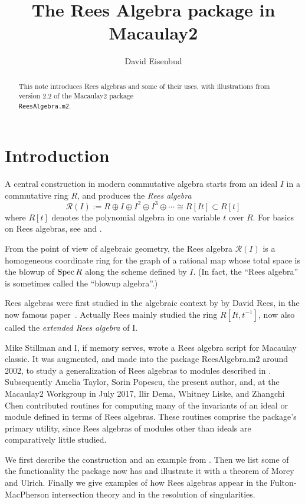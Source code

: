 \documentclass[twoside,12pt, leqno]{amsart}
\author{David Eisenbud}
\title{The Rees Algebra package in Macaulay2}
\def\RR{{\mathcal R}}
\def\Spec{{{\rm Spec}\,}}
\begin{document}
\begin{abstract}
This note introduces Rees algebras and some of their uses, with illustrations from version 2.2 of the Macaulay2 \cite{M2} package \\{\tt ReesAlgebra.m2}.
\end{abstract}

\maketitle

\section*{Introduction}
A central construction in modern commutative algebra starts from
an ideal $I$ in a commutative ring $R$, and produces the \emph{Rees algebra}
$$
\RR(I) :=  R\oplus I\oplus I^2\oplus I^3\oplus\cdots \cong R[It]\subset R[t]
$$ 
where $R[t]$ denotes the polynomial algebra in one variable $t$ over $R$. For basics on Rees algebras, see \cite{V} and \cite{SW}.

From the point of view of algebraic geometry, the Rees algebra $\RR(I)$ is a homogeneous
coordinate ring for the graph of a rational map whose total space is the blowup
of $\Spec R$ along the scheme defined by $I$.
 (In fact, the  ``Rees algebra'' is sometimes called the ``blowup algebra''.)  
     

     Rees algebras were first studied in the algebraic context by
      by David Rees, in the
     now famous paper~\cite{Rees}. Actually
     Rees mainly studied the ring 
     $R[It,t^{-1}]$, now also called the \emph{extended Rees
     algebra} of I. 
     
Mike Stillman and I, if memory serves, wrote a Rees algebra script for Macaulay classic. It was augmented, and made into the package ReesAlgebra.m2  around 2002,  to study a generalization of Rees algebras to modules described in \cite{EHU}. Subsequently
Amelia Taylor, 
Sorin Popescu, the present author,
and, at the Macaulay2 Workgroup in July 2017, 
Ilir Dema,
Whitney Liske, and
Zhangchi Chen
contributed routines
for computing many of the invariants of an ideal or module
defined in terms of Rees algebras. These routines comprise the package's primary utility, since Rees algebras
of modules other than ideals are comparatively little studied. 

We first describe the construction and an example from \cite{EHU}. Then we list some of the functionality the package now has and illustrate it with a theorem of Morey and Ulrich. Finally we give examples of how Rees algebras
appear in the Fulton-MacPherson intersection theory and in the resolution of singularities.
\end{document}
